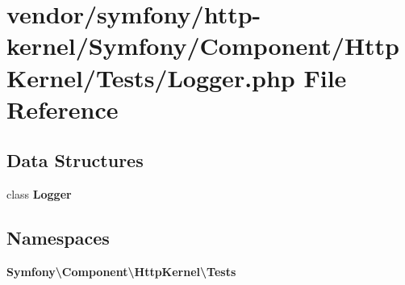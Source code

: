 \section{vendor/symfony/http-\/kernel/\+Symfony/\+Component/\+Http\+Kernel/\+Tests/\+Logger.php File Reference}
\label{symfony_2http-kernel_2_symfony_2_component_2_http_kernel_2_tests_2_logger_8php}
\subsection*{Data Structures}
\begin{DoxyCompactItemize}
\item 
class {\bf Logger}
\end{DoxyCompactItemize}
\subsection*{Namespaces}
\begin{DoxyCompactItemize}
\item 
 {\bf Symfony\textbackslash{}\+Component\textbackslash{}\+Http\+Kernel\textbackslash{}\+Tests}
\end{DoxyCompactItemize}
